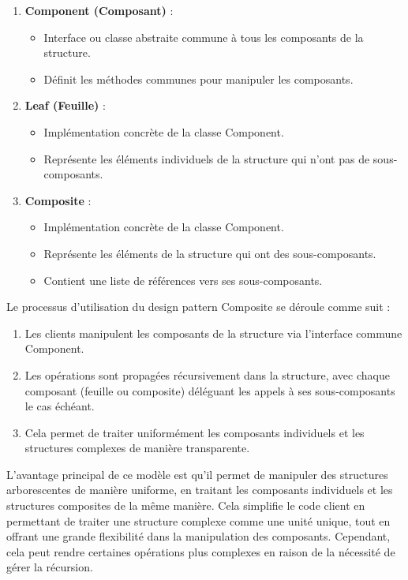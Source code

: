 \documentclass[french]{article}
\begin{document}
\begin{enumerate}
    \item \textbf{Component (Composant)} :
    \begin{itemize}
        \item Interface ou classe abstraite commune à tous les composants de la structure.
        \item Définit les méthodes communes pour manipuler les composants.
    \end{itemize}
    
    \item \textbf{Leaf (Feuille)} :
    \begin{itemize}
        \item Implémentation concrète de la classe Component.
        \item Représente les éléments individuels de la structure qui n'ont pas de sous-composants.
    \end{itemize}
    
    \item \textbf{Composite} :
    \begin{itemize}
        \item Implémentation concrète de la classe Component.
        \item Représente les éléments de la structure qui ont des sous-composants.
        \item Contient une liste de références vers ses sous-composants.
    \end{itemize}
\end{enumerate}

Le processus d'utilisation du design pattern Composite se déroule comme suit :

\begin{enumerate}
    \item Les clients manipulent les composants de la structure via l'interface commune Component.
    \item Les opérations sont propagées récursivement dans la structure, avec chaque composant (feuille ou composite) déléguant les appels à ses sous-composants le cas échéant.
    \item Cela permet de traiter uniformément les composants individuels et les structures complexes de manière transparente.
\end{enumerate}

L'avantage principal de ce modèle est qu'il permet de manipuler des structures arborescentes de manière uniforme, en traitant les composants individuels et les structures composites de la même manière. Cela simplifie le code client en permettant de traiter une structure complexe comme une unité unique, tout en offrant une grande flexibilité dans la manipulation des composants. Cependant, cela peut rendre certaines opérations plus complexes en raison de la nécessité de gérer la récursion.
\end{document}
